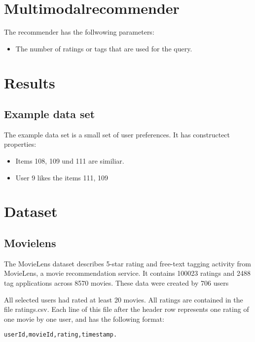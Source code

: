 \documentclass[twoside,a4paper]{article}
\begin{document}
\section{Multimodalrecommender}
\label{sec:multimodalrecommender}

The recommender has the follwowing parameters:
\begin{itemize}
\item The number of ratings or tags that are used for the query.
\end{itemize}

\section{Results}
\label{sec:results}


\subsection{Example data set}
\label{sec:exampledataset}

The example data set is a small set of user preferences. It has constructect properties:
\begin{itemize}
\item Items 108, 109 und 111 are similiar.
\item User 9 likes the items 111, 109 

\end{itemize}

\section{Dataset}
\label{sec:dataset}

\subsection{Movielens}
\label{sec:movielens}

The MovieLens dataset describes 5-star rating and free-text tagging activity from MovieLens, a movie recommendation service. It contains 100023 ratings and 2488 tag applications across 8570 movies. These data were created by 706 users 

All selected users had rated at least 20 movies.
All ratings are contained in the file ratings.csv. Each line of this file after the header row represents one rating of one movie by one user, and has the following format:

\begin{verbatim}
userId,movieId,rating,timestamp.
\end{verbatim}
\end{document}
